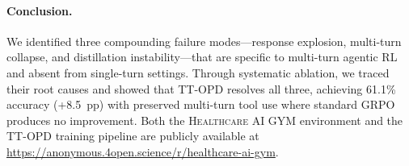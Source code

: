 \documentclass{article}
\newcommand{\gym}{\textsc{Healthcare AI GYM}}
\begin{document}
\paragraph{Conclusion.}
We identified three compounding failure modes---response explosion, multi-turn collapse, and distillation instability---that are specific to multi-turn agentic RL and absent from single-turn settings. Through systematic ablation, we traced their root causes and showed that TT-OPD resolves all three, achieving 61.1\% accuracy (+8.5~pp) with preserved multi-turn tool use where standard GRPO produces no improvement. Both the \gym{} environment and the TT-OPD training pipeline are publicly available at \url{https://anonymous.4open.science/r/healthcare-ai-gym}.


\end{document}
